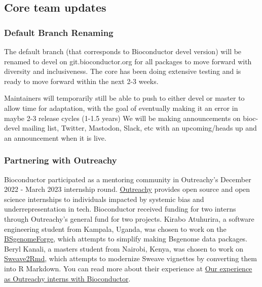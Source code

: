 \hypertarget{core-team-updates}{%
\subsection{Core team updates}\label{core-team-updates}}

\hypertarget{default-branch-renaming}{%
\subsubsection{Default Branch Renaming}\label{default-branch-renaming}}

The default branch (that corresponds to Bioconductor devel version) will be renamed to devel on git.bioconductor.org for all packages to move forward with diversity and inclusiveness. The core has been doing extensive testing and is ready to move forward within the next 2-3 weeks.

Maintainers will temporarily still be able to push to either devel or master to allow time for adaptation, with the goal of eventually making it an error in maybe 2-3 release cycles (1-1.5 years)
We will be making announcements on bioc-devel mailing list, Twitter, Mastodon, Slack, etc with an upcoming/heads up and an announcement when it is live.

\hypertarget{partnering-with-outreachy}{%
\subsubsection{Partnering with Outreachy}\label{partnering-with-outreachy}}

Bioconductor participated as a mentoring community in Outreachy's December 2022
- March 2023 internship round. \href{https://www.outreachy.org/}{Outreachy} provides
open source and open science internships to individuals impacted by systemic
bias and underrepresentation in tech. Bioconductor received funding for two
interns through Outreachy's general fund for two projects. Kirabo Atuhurira,
a software engineering student from Kampala, Uganda, was chosen to work on the
\href{https://github.com/Bioconductor/BSgenomeForge}{BSgenomeForge}, which attempts
to simplify making Bsgenome data packages. Beryl Kanali, a masters student
from Nairobi, Kenya, was chosen to work on
\href{https://github.com/Bioconductor/sweave2rmd}{Sweave2Rmd}, which attempts to
modernize Sweave vignettes by converting them into R Markdown. You can read more
about their experience at \href{https://bioconductor.github.io/biocblog/posts/2023-01-22-OutreachyInternship/}{Our experience as Outreachy interns with
Bioconductor}.

